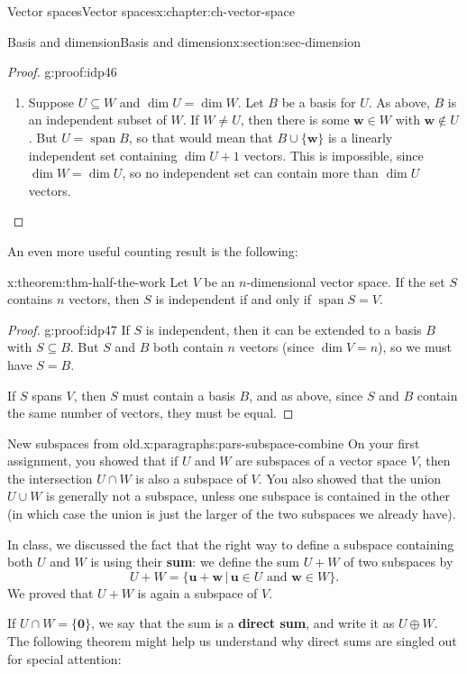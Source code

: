 \documentclass[oneside,10pt,]{book}
\newcommand{\terminology}[1]{\textbf{#1}}
\numberwithin{equation}{section}
\newcommand{\spn}{\operatorname{span}}
\newcommand{\uu}{\mathbf{u}}
\newcommand{\ww}{\mathbf{w}}
\begin{document}
\begin{chapterptx}{Vector spaces}{}{Vector spaces}{}{}{x:chapter:ch-vector-space}
\begin{sectionptx}{Basis and dimension}{}{Basis and dimension}{}{}{x:section:sec-dimension}
\begin{proof}{}{g:proof:idp46}
\begin{enumerate}
\item{}Suppose \(U\subseteq W\) and \(\dim U = \dim W\). Let \(B\) be a basis for \(U\). As above, \(B\) is an independent subset of \(W\). If \(W\neq U\), then there is some \(\ww\in W\) with \(\ww\notin U\). But \(U=\spn B\), so that would mean that \(B\cup \{\ww\}\) is a linearly independent set containing \(\dim U+1\) vectors. This is impossible, since \(\dim W=\dim U\), so no independent set can contain more than \(\dim U\) vectors.%
\end{enumerate}
%
\end{proof}
An even more useful counting result is the following:%
\begin{theorem}{}{}{x:theorem:thm-half-the-work}%
Let \(V\) be an \(n\)-dimensional vector space. If the set \(S\) contains \(n\) vectors, then \(S\) is independent if and only if \(\spn S=V\).%
\end{theorem}
\begin{proof}{}{g:proof:idp47}
If \(S\) is independent, then it can be extended to a basis \(B\) with \(S\subseteq B\). But \(S\) and \(B\) both contain \(n\) vectors (since \(\dim V=n\)), so we must have \(S=B\).%
\par
If \(S\) spans \(V\), then \(S\) must contain a basis \(B\), and as above, since \(S\) and \(B\) contain the same number of vectors, they must be equal.%
\end{proof}
\begin{paragraphs}{New subspaces from old.}{x:paragraphs:pars-subspace-combine}%
On your first assignment, you showed that if \(U\) and \(W\) are subspaces of a vector space \(V\), then the intersection \(U\cap W\) is also a subspace of \(V\). You also showed that the union \(U\cup W\) is generally not a subspace, unless one subspace is contained in the other (in which case the union is just the larger of the two subspaces we already have).%
\par
In class, we discussed the fact that the right way to define a subspace containing both \(U\) and \(W\) is using their \terminology{sum}: we define the sum \(U+W\) of two subspaces by%
\begin{equation*}
U+W = \{\uu+\ww \,|\, \uu\in U \text{ and } \ww\in W\}\text{.}
\end{equation*}
We proved that \(U+W\) is again a subspace of \(V\).%
\par
If \(U\cap W = \{\mathbf{0}\}\), we say that the sum is a \terminology{direct sum}, and write it as \(U\oplus W\). The following theorem might help us understand why direct sums are singled out for special attention:%

\end{paragraphs}
\end{sectionptx}
\end{chapterptx}
\end{document}
